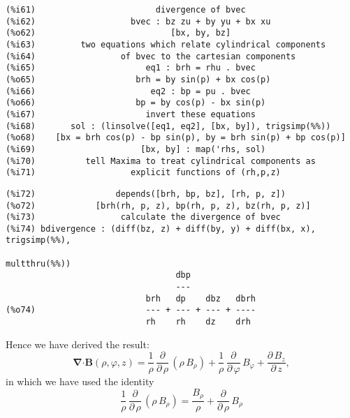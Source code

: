 \documentclass[12pt]{article}
\begin{document}
\small
\begin{verbatim}
(%i61)                        divergence of bvec 
(%i62)                   bvec : bz zu + by yu + bx xu
(%o62)                           [bx, by, bz]
(%i63)         two equations which relate cylindrical components
(%i64)                 of bvec to the cartesian components 
(%i65)                      eq1 : brh = rhu . bvec
(%o65)                    brh = by sin(p) + bx cos(p)
(%i66)                       eq2 : bp = pu . bvec
(%o66)                    bp = by cos(p) - bx sin(p)
(%i67)                      invert these equations 
(%i68)       sol : (linsolve([eq1, eq2], [bx, by]), trigsimp(%%))
(%o68)    [bx = brh cos(p) - bp sin(p), by = brh sin(p) + bp cos(p)]
(%i69)                     [bx, by] : map('rhs, sol)
(%i70)          tell Maxima to treat cylindrical components as 
(%i71)                   explicit functions of (rh,p,z) 
\end{verbatim}
\newpage
\begin{verbatim}
(%i72)                depends([brh, bp, bz], [rh, p, z])
(%o72)            [brh(rh, p, z), bp(rh, p, z), bz(rh, p, z)]
(%i73)                 calculate the divergence of bvec 
(%i74) bdivergence : (diff(bz, z) + diff(by, y) + diff(bx, x), trigsimp(%%), 
                                                                  multthru(%%))
                                  dbp
                                  ---
                            brh   dp    dbz   dbrh
(%o74)                      --- + --- + --- + ----
                            rh    rh    dz    drh
\end{verbatim}
\normalsize

Hence we have derived the result:
\begin{equation}
\boldsymbol{\nabla} \boldsymbol{\cdot} \mathbf{B}(\rho,\varphi,z) = 
 \frac{1}{\rho}\,\frac{\partial}{\partial \,\rho} \,\left( \rho \, B_{\rho} \right) +
       \frac{1}{\rho} \, \frac{\partial}{\partial \, \varphi} \, B_{\varphi} +
	   \frac{\partial \, B_{z} }{\partial \, z},
\end{equation}  
in which we have used the identity
\begin{equation}
\frac{1}{\rho}\,\frac{\partial}{\partial \,\rho} \,\left( \rho \, B_{\rho} \right) = 
  \frac{B_{\rho}}{\rho} + \frac{\partial}{\partial \, \rho} \, B_{\rho} 
\end{equation}
\end{document}
